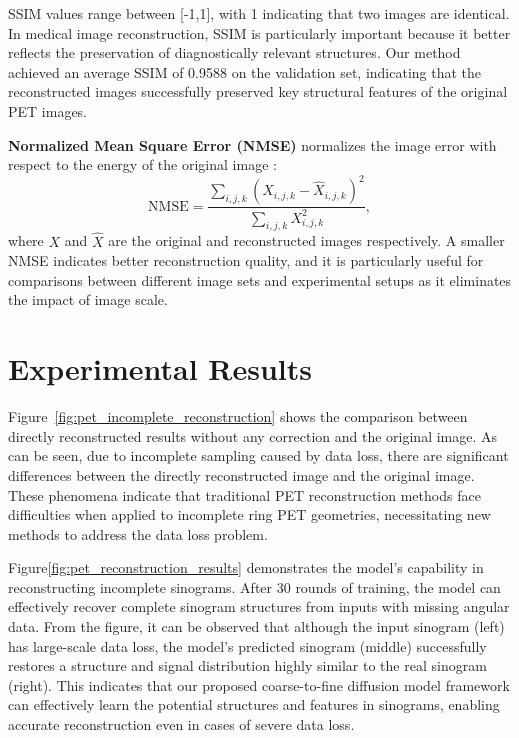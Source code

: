 \documentclass[12pt]{iopart}
\begin{document}
SSIM values range between [-1,1], with 1 indicating that two images are identical. In medical image reconstruction, SSIM is particularly important because it better reflects the preservation of diagnostically relevant structures. Our method achieved an average SSIM of 0.9588 on the validation set, indicating that the reconstructed images successfully preserved key structural features of the original PET images.

\textbf{Normalized Mean Square Error (NMSE)} normalizes the image error with respect to the energy of the original image \cite{Higashiyama2024NMSE}:
\begin{equation}
\text{NMSE} = \frac{\sum_{i,j,k}(X_{i,j,k} - \hat{X}_{i,j,k})^2}{\sum_{i,j,k}X_{i,j,k}^2},
\end{equation}
where $X$ and $\hat{X}$ are the original and reconstructed images respectively. A smaller NMSE indicates better reconstruction quality, and it is particularly useful for comparisons between different image sets and experimental setups as it eliminates the impact of image scale.




\section{Experimental Results}

\label{chap:results}

Figure~\ref{fig:pet_incomplete_reconstruction} shows the comparison between directly reconstructed results without any correction and the original image. As can be seen, due to incomplete sampling caused by data loss, there are significant differences between the directly reconstructed image and the original image. These phenomena indicate that traditional PET reconstruction methods face difficulties when applied to incomplete ring PET geometries, necessitating new methods to address the data loss problem.

Figure\ref{fig:pet_reconstruction_results} demonstrates the model's capability in reconstructing incomplete sinograms. After 30 rounds of training, the model can effectively recover complete sinogram structures from inputs with missing angular data. From the figure, it can be observed that although the input sinogram (left) has large-scale data loss, the model's predicted sinogram (middle) successfully restores a structure and signal distribution highly similar to the real sinogram (right). This indicates that our proposed coarse-to-fine diffusion model framework can effectively learn the potential structures and features in sinograms, enabling accurate reconstruction even in cases of severe data loss.
\end{document}
